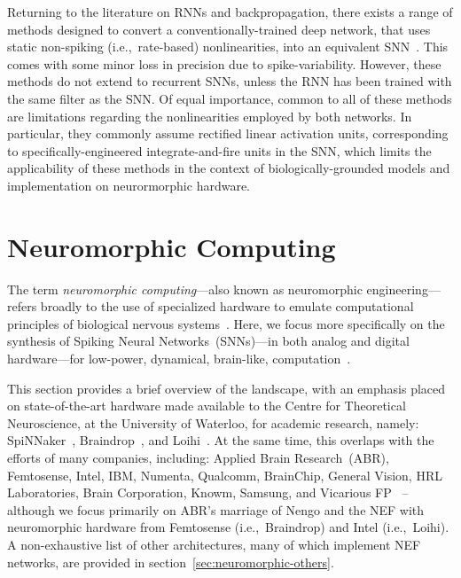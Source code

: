 Returning to the literature on RNNs and backpropagation, there exists a range of methods designed to convert a conventionally-trained deep network, that uses static non-spiking (i.e.,~rate-based) nonlinearities, into an equivalent SNN~\citep{rueckauer2017conversion, yousefzadehconversion2019}.
This comes with some minor loss in precision due to spike-variability.
However, these methods do not extend to recurrent SNNs, unless the RNN has been trained with the same filter as the SNN.
Of equal importance, common to all of these methods are limitations regarding the nonlinearities employed by both networks.
In particular, they commonly assume rectified linear activation units, corresponding to specifically-engineered integrate-and-fire units in the SNN, which limits the applicability of these methods in the context of biologically-grounded models and implementation on neurormorphic hardware.

\section{Neuromorphic Computing}
\label{sec:neuromorphic}

The term \emph{neuromorphic computing}---also known as neuromorphic engineering---refers broadly to the use of specialized hardware to emulate computational principles of biological nervous systems~\citep{mead1989analog, liu2002analog}.
Here, we focus more specifically on the synthesis of Spiking Neural Networks~(SNNs)---in both analog and digital hardware---for low-power, dynamical, brain-like, computation~\citep{boahen2017neuromorph}.

This section provides a brief overview of the landscape, with an emphasis placed on state-of-the-art hardware made available to the Centre for Theoretical Neuroscience, at the University of Waterloo, for academic research, namely: SpiNNaker~\citep{furber2014spinnaker}, Braindrop~\citep{braindrop2019}, and Loihi~\citep{davies2018loihi}.
At the same time, this overlaps with the efforts of many companies, including: Applied Brain Research~(ABR), Femtosense, Intel, IBM, Numenta, Qualcomm, BrainChip, General Vision, HRL Laboratories, Brain Corporation, Knowm, Samsung, and Vicarious FP~\citep{marketreport2018, femtosense} -- although we focus primarily on ABR's marriage of Nengo and the NEF with neuromorphic hardware from Femtosense (i.e.,~Braindrop) and Intel (i.e.,~Loihi).
A non-exhaustive list of other architectures, many of which implement NEF networks, are provided in section~\ref{sec:neuromorphic-others}.

